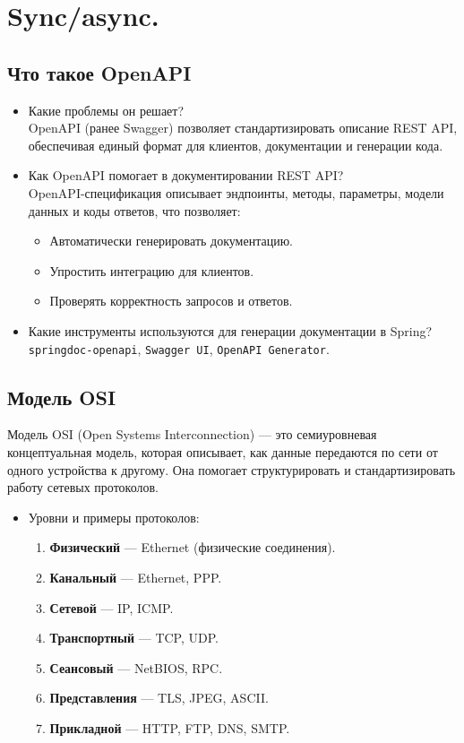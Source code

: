 \documentclass[a4paper,14pt]{article}
\begin{document}
\section{Sync/async.}
\subsection{Что такое OpenAPI}

\begin{itemize}
\item Какие проблемы он решает? \\
OpenAPI (ранее Swagger) позволяет стандартизировать описание REST API, обеспечивая единый формат для клиентов, документации и генерации кода.

\item Как OpenAPI помогает в документировании REST API? \\
OpenAPI-спецификация описывает эндпоинты, методы, параметры, модели данных и коды ответов, что позволяет:
\begin{itemize}
  \item Автоматически генерировать документацию.
  \item Упростить интеграцию для клиентов.
  \item Проверять корректность запросов и ответов.
\end{itemize}

\item Какие инструменты используются для генерации документации в Spring? \\
\texttt{springdoc-openapi}, \texttt{Swagger UI}, \texttt{OpenAPI Generator}.
\end{itemize}

\subsection{Модель OSI}
Модель OSI (Open Systems Interconnection) — это семиуровневая концептуальная модель, которая описывает, как данные передаются по сети от одного устройства к другому. Она помогает структурировать и стандартизировать работу сетевых протоколов.
\begin{itemize}
\item Уровни и примеры протоколов:
\begin{enumerate}
  \item \textbf{Физический} — Ethernet (физические соединения).
  \item \textbf{Канальный} — Ethernet, PPP.
  \item \textbf{Сетевой} — IP, ICMP.
  \item \textbf{Транспортный} — TCP, UDP.
  \item \textbf{Сеансовый} — NetBIOS, RPC.
  \item \textbf{Представления} — TLS, JPEG, ASCII.
  \item \textbf{Прикладной} — HTTP, FTP, DNS, SMTP.
\end{enumerate}
\end{itemize}
\end{document}

